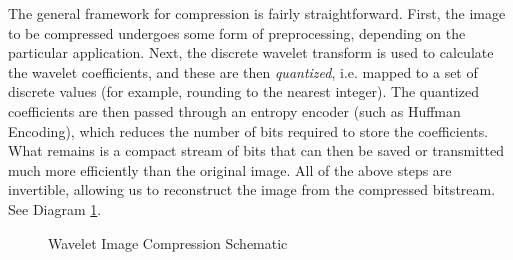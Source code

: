 The general framework for compression is fairly straightforward. First,
the image to be compressed undergoes some form of preprocessing,
depending on the particular application.
Next, the discrete wavelet transform is used to calculate
the wavelet coefficients, and these are then \textit{quantized},
i.e. mapped to a set of discrete values (for example, rounding to the nearest integer).
The quantized coefficients are
then passed through an entropy encoder (such as Huffman Encoding), which reduces
the number of bits required to store the coefficients.
What remains is a compact stream of bits
that can then be saved or transmitted much more efficiently than the
original image. All of the above steps are invertible, allowing us to
reconstruct the image from the compressed bitstream. See Diagram
\ref{tikz:wsqscheme}.

\begin{figure}
\centering
{}
\caption{Wavelet Image Compression Schematic}
\label{tikz:wsqscheme}
\end{figure}

